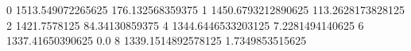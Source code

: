 0 1513.549072265625 176.132568359375
1 1450.6793212890625 113.2628173828125
2 1421.7578125 84.34130859375
4 1344.6446533203125 7.2281494140625
6 1337.41650390625 0.0
8 1339.1514892578125 1.7349853515625
